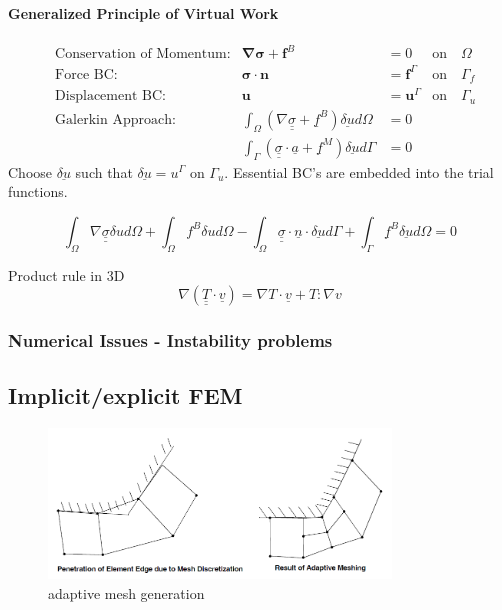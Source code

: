 \paragraph{Generalized Principle of Virtual Work}
\begin{align*}
&\textrm{Conservation of Momentum:} & \boldsymbol{\nabla\sigma+f}^{B}	&=0 			&\textrm{on} \quad \Omega
\\
&\textrm{Force BC:} 				& \boldsymbol{\sigma\cdot n	}		&=\boldsymbol{f}^{\Gamma} &\textrm{on} \quad \Gamma_{f}
\\
&\textrm{Displacement BC:}			& \boldsymbol{u}						&=\boldsymbol{u}^{\Gamma} &\textrm{on} \quad \Gamma_{u}
\\
&\textrm{Galerkin Approach:} & \int_{\Omega}(\nabla\underline{\underline{\sigma}}+\underline{f}^{B})\underline{\delta u}d\Omega&=0 
\\
& & \int_{\Gamma}(\underline{\underline{\sigma}}\cdot \underline{a}+\underline{f}^{M})\underline{\delta u}d\Gamma&=0 
\end{align*}
Choose $\underline{\delta u}$ such that $\underline{\delta u}=u^{\Gamma}$ on $\Gamma_{u}$. Essential BC's are embedded into the trial functions.

\begin{equation}
\int_{\Omega}\nabla\underline{\underline{\sigma}}\delta u d\Omega+ \int_{\Omega}f^B \delta u d\Omega - \int_{\Omega}\underline{\underline{\sigma}} \cdot \underline{n} \cdot \underline{\delta u} d\Gamma + \int_{\Gamma}\underline{f}^{B} \underline{\delta u} d\Omega = 0
\end{equation}

Product rule in 3D
\begin{equation}
\nabla (\underline{\underline{T}}\cdot \underline{v})= \nabla T \cdot \underline{v}+ T:\nabla v
\end{equation}
\subsubsection{Numerical Issues - Instability problems}

\subsection{Implicit/explicit FEM}



\begin{figure}[h]
\centering
  \includegraphics[height=4cm]{img/Adaptive.png}
   \caption{adaptive mesh generation}
 \label{fgr:graft}
\end{figure}

